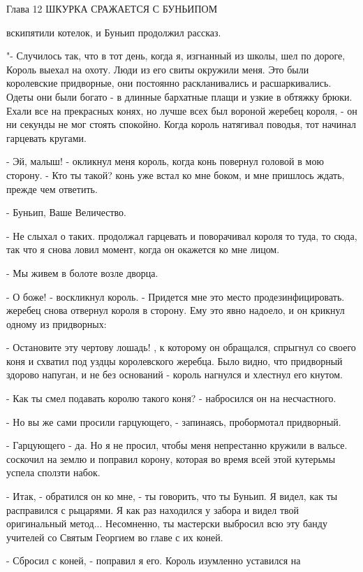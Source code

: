 Глава 12
 ШКУРКА СРАЖАЕТСЯ С БУНЬИПОМ
\par{} вскипятили котелок, и Буньип продолжил рассказ.
\par"- Случилось так, что в тот день, когда я, изгнанный из школы, шел 
по дороге, Король выехал на охоту. Люди из его свиты окружили меня. 
Это были королевские придворные, они постоянно раскланивались и 
расшаркивались. Одеты они были богато - в длинные бархатные плащи и 
узкие в обтяжку брюки. Ехали все на прекрасных конях, но лучше всех 
был вороной жеребец короля, - он ни секунды не мог стоять спокойно. 
Когда король натягивал поводья, тот начинал гарцевать кругами.
\par- Эй, малыш! - окликнул меня король, когда конь повернул головой в 
мою сторону. - Кто ты такой?
 конь уже встал ко мне боком, и мне пришлось ждать, прежде чем 
ответить.
\par- Буньип, Ваше Величество.
\par- Не слыхал о таких.
 продолжал гарцевать и поворачивал короля то туда, то сюда, 
так что я снова ловил момент, когда он окажется ко мне лицом.
\par- Мы живем в болоте возле дворца.
\par- О боже! - воскликнул король. - Придется мне это место 
продезинфицировать.
 жеребец снова отвернул короля в сторону. Ему это явно надоело, 
и он крикнул одному из придворных:
\par- Остановите эту чертову лошадь!
, к которому он обращался, спрыгнул со своего коня и 
схватил под уздцы королевского жеребца. Было видно, что придворный 
здорово напуган, и не без оснований - король нагнулся и хлестнул его 
кнутом.
\par- Как ты смел подавать королю такого коня? - набросился он на 
несчастного.
\par- Но вы же сами просили гарцующего, - запинаясь, пробормотал 
придворный.
\par- Гарцующего - да. Но я не просил, чтобы меня непрестанно кружили 
в вальсе.
 соскочил на землю и поправил корону, которая во время всей 
этой кутерьмы успела сползти набок.
\par- Итак, - обратился он ко мне, - ты говорить, что ты Буньип. Я 
видел, как ты расправился с рыцарями. Я как раз находился у забора и 
видел твой оригинальный метод... Несомненно, ты мастерски выбросил всю 
эту банду учителей со Святым Георгием во главе с их коней.
\par- Сбросил с коней, - поправил я его. Король изумленно уставился на 
